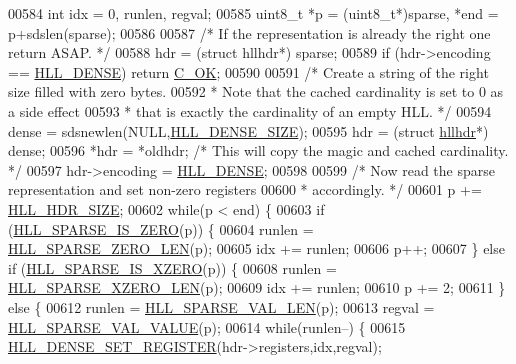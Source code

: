 \begin{DoxyCode}
{{00584     \textcolor{keywordtype}{int} idx = 0, runlen, regval;
00585     uint8\_t *p = (uint8\_t*)sparse, *end = p+sdslen(sparse);
00586 
00587     \textcolor{comment}{/* If the representation is already the right one return ASAP. */}
00588     hdr = (\textcolor{keyword}{struct} hllhdr*) sparse;
00589     \textcolor{keywordflow}{if} (hdr->encoding == \hyperlink{hyperloglog_8c_a5f2ead2492fc9cc4ff39f8c1752875a1}{HLL\_DENSE}) \textcolor{keywordflow}{return} \hyperlink{server_8h_a303769ef1065076e68731584e758d3e1}{C\_OK};
00590 
00591     \textcolor{comment}{/* Create a string of the right size filled with zero bytes.}
00592 \textcolor{comment}{     * Note that the cached cardinality is set to 0 as a side effect}
00593 \textcolor{comment}{     * that is exactly the cardinality of an empty HLL. */}
00594     dense = sdsnewlen(NULL,\hyperlink{hyperloglog_8c_ad677821a745c7306ef02ccca0ff6f92f}{HLL\_DENSE\_SIZE});
00595     hdr = (\textcolor{keyword}{struct} \hyperlink{structhllhdr}{hllhdr}*) dense;
00596     *hdr = *oldhdr; \textcolor{comment}{/* This will copy the magic and cached cardinality. */}
00597     hdr->encoding = \hyperlink{hyperloglog_8c_a5f2ead2492fc9cc4ff39f8c1752875a1}{HLL\_DENSE};
00598 
00599     \textcolor{comment}{/* Now read the sparse representation and set non-zero registers}
00600 \textcolor{comment}{     * accordingly. */}
00601     p += \hyperlink{hyperloglog_8c_af04dc163054c4c79b0e6c93057b4032f}{HLL\_HDR\_SIZE};
00602     \textcolor{keywordflow}{while}(p < end) \{
00603         \textcolor{keywordflow}{if} (\hyperlink{hyperloglog_8c_a0b65ae2290df116ae4ed18188dffb5ad}{HLL\_SPARSE\_IS\_ZERO}(p)) \{
00604             runlen = \hyperlink{hyperloglog_8c_a0ed89a76f49a89991af87cce34c3260b}{HLL\_SPARSE\_ZERO\_LEN}(p);
00605             idx += runlen;
00606             p++;
00607         \} \textcolor{keywordflow}{else} \textcolor{keywordflow}{if} (\hyperlink{hyperloglog_8c_ac672e0af491e4cbfe7a5859ae4dc74f9}{HLL\_SPARSE\_IS\_XZERO}(p)) \{
00608             runlen = \hyperlink{hyperloglog_8c_a95fbeb27967ea46816fd354ddb59564e}{HLL\_SPARSE\_XZERO\_LEN}(p);
00609             idx += runlen;
00610             p += 2;
00611         \} \textcolor{keywordflow}{else} \{
00612             runlen = \hyperlink{hyperloglog_8c_a5c74b3b50c822c01c1976a72b84db12f}{HLL\_SPARSE\_VAL\_LEN}(p);
00613             regval = \hyperlink{hyperloglog_8c_ad36de263468a9ce3b1409743b8da64d7}{HLL\_SPARSE\_VAL\_VALUE}(p);
00614             \textcolor{keywordflow}{while}(runlen--) \{
00615                 \hyperlink{hyperloglog_8c_a57f99ca1675593d83a5b1fc014b3945a}{HLL\_DENSE\_SET\_REGISTER}(hdr->registers,idx,regval);
}}
\end{DoxyCode}
